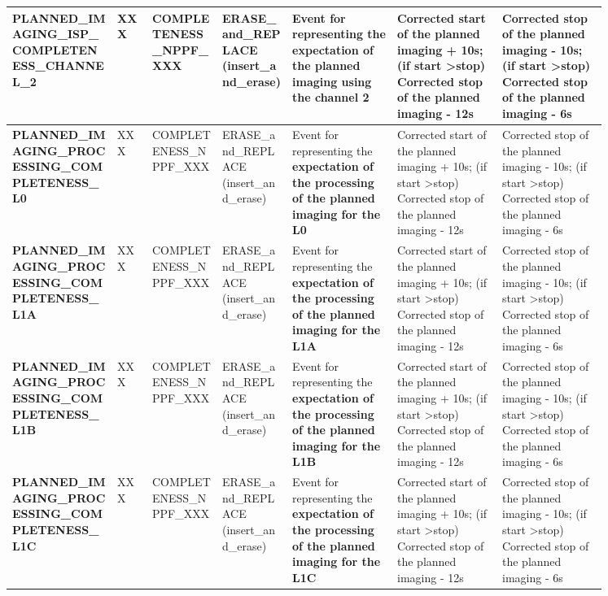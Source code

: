\begin{landscape}
\begin{longtable}{|M{0.15\linewidth}|M{0.05\linewidth}|M{0.10\linewidth}|M{0.10\linewidth}|M{0.15\linewidth}|M{0.15\linewidth}|M{0.15\linewidth}|}
\textbf{PLANNED\_IMAGING\_ISP\_COMPLETENESS\_CHANNEL\_2} & XXX & \- COMPLETENESS\_NPPF\_XXX & ERASE\_and\_REPLACE (insert\_and\_erase) & Event for representing the \textbf{expectation of the planned imaging using the channel 2} & Corrected start of the planned imaging + 10s; (if start \textgreater  stop) Corrected stop of the planned imaging - 12s & Corrected stop of the planned imaging - 10s; (if start \textgreater  stop) Corrected stop of the planned imaging - 6s \\ \hline
\textbf{PLANNED\_IMAGING\_PROCESSING\_COMPLETENESS\_L0} & XXX & \- COMPLETENESS\_NPPF\_XXX & ERASE\_and\_REPLACE (insert\_and\_erase) & Event for representing the \textbf{expectation of the processing of the planned imaging for the L0} & Corrected start of the planned imaging + 10s; (if start \textgreater  stop) Corrected stop of the planned imaging - 12s & Corrected stop of the planned imaging - 10s; (if start \textgreater  stop) Corrected stop of the planned imaging - 6s \\ \hline
\textbf{PLANNED\_IMAGING\_PROCESSING\_COMPLETENESS\_L1A} & XXX & \- COMPLETENESS\_NPPF\_XXX & ERASE\_and\_REPLACE (insert\_and\_erase) & Event for representing the \textbf{expectation of the processing of the planned imaging for the L1A} & Corrected start of the planned imaging + 10s; (if start \textgreater  stop) Corrected stop of the planned imaging - 12s & Corrected stop of the planned imaging - 10s; (if start \textgreater  stop) Corrected stop of the planned imaging - 6s \\ \hline
\textbf{PLANNED\_IMAGING\_PROCESSING\_COMPLETENESS\_L1B} & XXX & \- COMPLETENESS\_NPPF\_XXX & ERASE\_and\_REPLACE (insert\_and\_erase) & Event for representing the \textbf{expectation of the processing of the planned imaging for the L1B} & Corrected start of the planned imaging + 10s; (if start \textgreater  stop) Corrected stop of the planned imaging - 12s & Corrected stop of the planned imaging - 10s; (if start \textgreater  stop) Corrected stop of the planned imaging - 6s \\ \hline
\textbf{PLANNED\_IMAGING\_PROCESSING\_COMPLETENESS\_L1C} & XXX & \- COMPLETENESS\_NPPF\_XXX & ERASE\_and\_REPLACE (insert\_and\_erase) & Event for representing the \textbf{expectation of the processing of the planned imaging for the L1C} & Corrected start of the planned imaging + 10s; (if start \textgreater  stop) Corrected stop of the planned imaging - 12s & Corrected stop of the planned imaging - 10s; (if start \textgreater  stop) Corrected stop of the planned imaging - 6s \\ \hline

\end{longtable}
\end{landscape}
